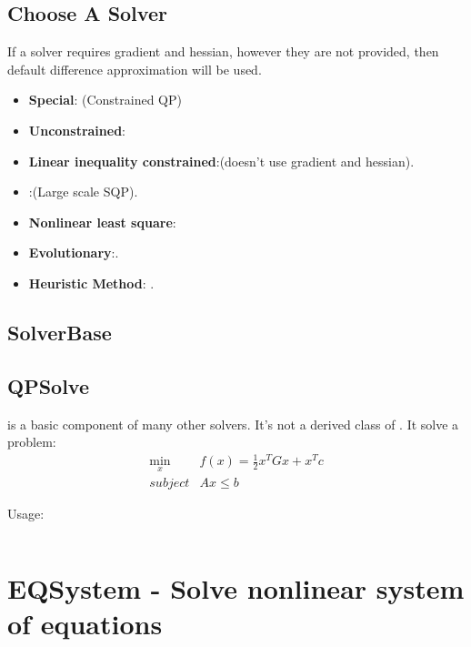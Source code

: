 \subsection{Choose A Solver}
If a solver requires gradient and hessian, however they are not provided, then default difference approximation will be used.

\begin{itemize}
	\item \textbf{Special}: (Constrained QP)
	\item \textbf{Unconstrained}:
	\item \textbf{Linear inequality constrained}:(doesn't use gradient and hessian).
	\item {}:(Large scale SQP).
	\item \textbf{Nonlinear least square}:
	\item \textbf{Evolutionary}:.
	\item \textbf{Heuristic Method}: .
\end{itemize}
\subsection{SolverBase}

\subsection{QPSolve}
 is a basic component of many other solvers. It's not a derived class of . It solve a problem:
\begin{align}
\min_x & f(x)=\frac{1}{2}x^TGx+x^Tc \\
subject & Ax \leq b
\end{align}

Usage:

\begin{lstlisting}

\end{lstlisting}

\section{EQSystem - Solve nonlinear system of equations}
